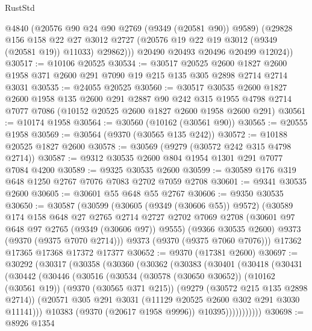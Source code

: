 \begin{lexlean}{RustStd}
\begin{coremodule}
            @4840
            (@20576 @90 @24 @90 @2769 (@9349 (@20581 @90)) @9589)
            (@29828
              @156
              @158
              @22
              @27
              @3012
              @2727
              (@20576 @19 @22 @19 @3012 (@9349 (@20581 @19)) @11033)
              @29862)))
        @20490
        @20493
        @20496
        @20499
        @12024))
@30517 := @10106 @20525
@30534 := @30517
    @20525
    @2600
    @1827
    @2600
    @1958
    @371
    @2600
    @291
    @7090
    @19
    @215
    @135
    @305
    @2898
    @2714
    @2714
    @3031
@30535 := @24055 @20525
@30560 := @30517
    @30535
    @2600
    @1827
    @2600
    @1958
    @135
    @2600
    @291
    @2887
    @90
    @242
    @315
    @1955
    @4798
    @2714
    @7077
    @7086
    (@10152 @20525 @2600 @1827 @2600 @1958 @2600 @291)
@30561 := @10174 @1958
@30564 := @30560 (@10162 (@30561 @90))
@30565 := @20555 @1958
@30569 := @30564 (@9370 (@30565 @135 @242))
@30572 := @10188 @20525 @1827 @2600
@30578 := @30569 (@9279 (@30572 @242 @315 @4798 @2714))
@30587 := @9312 @30535 @2600 @804 @1954 @1301 @291 @7077 @7084 @4200
@30589 := @9325 @30535 @2600
@30599 := @30589 @176 @319 @648 @1250 @2767 @7076 @7083 @2702 @7059 @2708
@30601 := @9341 @30535 @2600
@30605 := @30601 @55 @648 @55 @2767
@30606 := @9350 @30535
@30650 := @30587
    (@30599
      (@30605 (@9349 (@30606 @55)) @9572)
      (@30589
        @174
        @158
        @648
        @27
        @2765
        @2714
        @2727
        @2702
        @7069
        @2708
        (@30601 @97 @648 @97 @2765 (@9349 (@30606 @97)) @9555)
        (@9366 @30535 @2600)
        @9373
        (@9370 (@9375 @7070 @2714)))
      @9373
      (@9370 (@9375 @7060 @7076)))
    @17362
    @17365
    @17368
    @17372
    @17377
@30652 := @9370 (@17381 @2600)
@30697 := @30292
    (@30317
      (@30358
        (@30360
          (@30362
            (@30383
              (@30401
                (@30418
                  (@30431
                    (@30442
                      (@30446
                        (@30516
                          (@30534
                            (@30578 (@30650 @30652))
                            (@10162 (@30561 @19))
                            (@9370 (@30565 @371 @215))
                            (@9279 (@30572 @215 @135 @2898 @2714))
                            (@20571 @305 @291 @3031 (@11129 @20525 @2600 @302 @291 @3030 @11141)))
                          @10383
                          (@9370 (@20617 @1958 @9996))
                          @10395)))))))))))
@30698 := @8926 @1354

\end{coremodule}
\end{lexlean}
